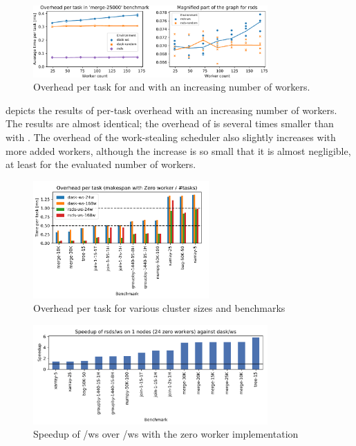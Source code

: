 \begin{figure}
	\centering
	\includegraphics[width=0.8\textwidth]{./imgs/rsds/charts/rsds-merge-worker-scaling}
	\caption{Overhead per task for \rsds{} and \dask{} with an
	increasing number of workers.}
	\label{fig:rsds-merge-worker-scaling}
\end{figure}

 depicts the results of per-task overhead with an increasing
number of workers. The results are almost identical; the overhead of \rsds{} is
several times smaller than with \dask{}. The overhead of the work-stealing
scheduler also slightly increases with more added workers, although the increase is so small that
it is almost negligible, at least for the evaluated number of workers.

\begin{figure}[h]
	\centering
	\includegraphics[width=0.6\textwidth]{./imgs/rsds/charts/rsds-dask-overhead-all}
	\caption{Overhead per task for various cluster sizes and benchmarks}
	\label{fig:rsds-dask-overhead-all}
\end{figure}

\begin{figure}[h]
	\centering
	\includegraphics[width=0.8\textwidth]{./imgs/rsds/charts/speedup-zw-rsds-ws-1}
	\caption{Speedup of \rsds{}/ws over \dask{}/ws with the zero worker
	implementation}
	\label{fig:rsds-zero-worker-speedup}
\end{figure}

